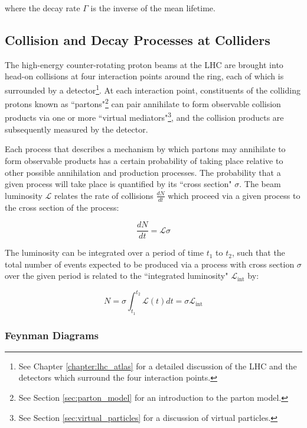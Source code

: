 \noindent where the decay rate \(\Gamma\) is the inverse of the mean lifetime.  

\subsection{Collision and Decay Processes at Colliders}
\label{sec:col_decay_procs}

The high-energy counter-rotating proton beams at the LHC are brought into head-on collisions at four interaction points around the ring, each of which is surrounded by a detector\footnote{See Chapter \ref{chapter:lhc_atlas} for a detailed discussion of the LHC and the detectors which surround the four interaction points.}. At each interaction point, constituents of the colliding protons known as ``partons"\footnote{See Section \ref{sec:parton_model} for an introduction to the parton model.} can pair annihilate to form observable collision products via one or more ``virtual mediators"\footnote{See Section \ref{sec:virtual_particles} for a discussion of virtual particles.}, and the collision products are subsequently measured by the detector. 

Each process that describes a mechanism by which partons may annihilate to form observable products has a certain probability of taking place relative to other possible annihilation and production processes. The probability that a given process will take place is quantified by its ``cross section" \(\sigma\). The beam luminosity \(\mathcal{L}\) relates the rate of collisions \(\frac{dN}{dt}\) which proceed via a given process to the cross section of the process:

\begin{equation}
\frac{dN}{dt} = \mathcal{L}\sigma
\end{equation}

The luminosity can be integrated over a period of time \(t_1\) to \(t_2\), such that the total number of events expected to be produced via a process with cross section \(\sigma\) over the given period is related to the ``integrated luminosity" \(\mathcal{L}_\text{int}\) by:

\begin{equation}
\label{eq:integrated_lumi}
N = \sigma\int_{t_1}^{t_2}\mathcal{L}(t)dt = \sigma\mathcal{L}_\text{int}
\end{equation}

\subsubsection{Feynman Diagrams}


